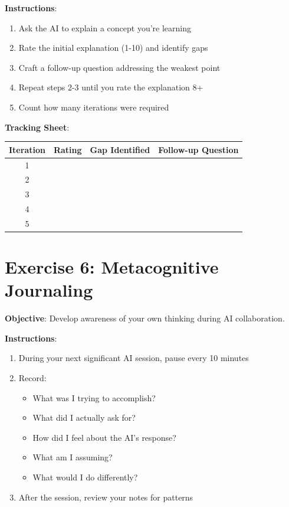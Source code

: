 \textbf{Instructions}:
\begin{enumerate}
    \item Ask the AI to explain a concept you're learning
    \item Rate the initial explanation (1-10) and identify gaps
    \item Craft a follow-up question addressing the weakest point
    \item Repeat steps 2-3 until you rate the explanation 8+
    \item Count how many iterations were required
\end{enumerate}

\textbf{Tracking Sheet}:
\begin{table}[H]
\centering
\begin{tabular}{cccp{5cm}}
\toprule
\textbf{Iteration} & \textbf{Rating} & \textbf{Gap Identified} & \textbf{Follow-up Question} \\
\midrule
1 & & & \\
2 & & & \\
3 & & & \\
4 & & & \\
5 & & & \\
\bottomrule
\end{tabular}
\end{table}

\section{Exercise 6: Metacognitive Journaling}

\textbf{Objective}: Develop awareness of your own thinking during AI collaboration.

\textbf{Instructions}:
\begin{enumerate}
    \item During your next significant AI session, pause every 10 minutes
    \item Record:
    \begin{itemize}
        \item What was I trying to accomplish?
        \item What did I actually ask for?
        \item How did I feel about the AI's response?
        \item What am I assuming?
        \item What would I do differently?
    \end{itemize}
    \item After the session, review your notes for patterns
\end{enumerate}

